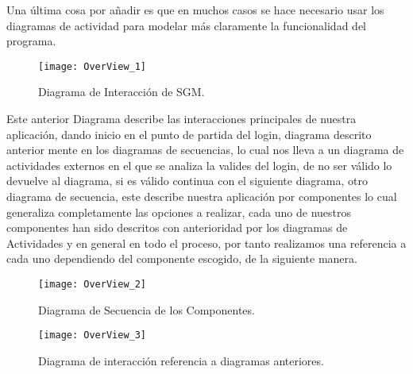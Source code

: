 \newline
Una última cosa por añadir es que en muchos casos se hace necesario usar los diagramas de actividad para modelar más claramente la funcionalidad del programa.
\newpage
\begin{figure}[H]
	\centering
	\texttt{[image: OverView\_1]}
	\centering
	\caption{Diagrama de Interacción de SGM.}
	\label{fig:OverView_1}
\end{figure}
Este anterior Diagrama describe las interacciones principales de nuestra aplicación, dando inicio en el punto de partida del login, diagrama descrito anterior mente en los diagramas de secuencias, lo cual nos lleva a un diagrama de actividades externos en el que se analiza la valides del login, de no ser válido lo devuelve al diagrama, si es válido continua con el siguiente diagrama, otro diagrama de secuencia, este describe nuestra aplicación por componentes lo cual generaliza completamente las opciones a realizar, cada uno de nuestros componentes han sido descritos con anterioridad por los diagramas de Actividades y en general en todo el proceso, por tanto realizamos una referencia a cada uno dependiendo del componente escogido, de la siguiente manera.

\begin{figure}[H]
	\centering
	\texttt{[image: OverView\_2]}
	\centering
	\caption{Diagrama de Secuencia de los Componentes.}
	\label{fig:OverView_2}
\end{figure}
\begin{figure}[H]
	\centering
	\texttt{[image: OverView\_3]}
	\centering
	\caption{Diagrama de interacción referencia a diagramas anteriores.}
	\label{fig:OverView_3}
\end{figure}


